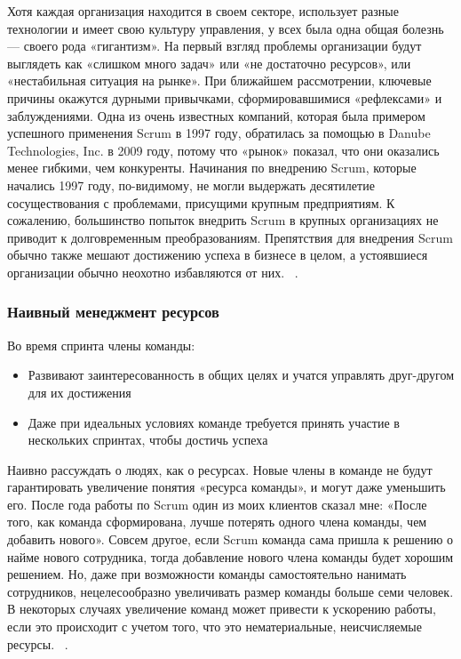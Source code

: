 \documentclass{../industrial-development}
\begin{document}
\lecturenotes
Хотя каждая организация находится в своем секторе, использует разные технологии и имеет свою культуру управления, у всех была одна общая болезнь — своего рода «гигантизм». На первый взгляд проблемы организации будут выглядеть как «слишком много задач» или «не достаточно ресурсов», или «нестабильная ситуация на рынке». При ближайшем рассмотрении, ключевые причины окажутся дурными привычками, сформировавшимися «рефлексами» и заблуждениями. Одна из очень известных компаний, которая была примером успешного применения Scrum в 1997 году, обратилась за помощью в Danube Technologies, Inc. в 2009 году, потому что «рынок» показал, что они оказались менее гибкими, чем конкуренты. Начинания по внедрению Scrum, которые начались 1997 году, по-видимому, не могли выдержать десятилетие сосуществования с проблемами, присущими крупным предприятиям. К сожалению, большинство попыток внедрить Scrum в крупных организациях не приводит к долговременным преобразованиям. Препятствия для внедрения Scrum обычно также мешают достижению успеха в бизнесе в целом, а устоявшиеся организации обычно неохотно избавляются от них. 
~\cite{Fowler}.


\begin{frame} \frametitle{Наивный менеджмент ресурсов }
	Во время спринта члены команды:
	\begin{itemize}
		\item Развивают заинтересованность в общих целях и учатся управлять друг-другом для их достижения
		\item Даже при идеальных условиях команде требуется принять участие в нескольких спринтах, чтобы достичь успеха
\end{itemize}
\end{frame}

\lecturenotes
Наивно рассуждать о людях, как о ресурсах. Новые члены в команде не будут гарантировать увеличение понятия «ресурса команды», и могут даже уменьшить его. После года работы по Scrum один из моих клиентов сказал мне: «После того, как команда сформирована, лучше потерять одного члена команды, чем добавить нового». Совсем другое, если Scrum команда сама пришла к решению о найме нового сотрудника, тогда добавление нового члена команды будет хорошим решением. Но, даже при возможности команды самостоятельно нанимать сотрудников, нецелесообразно увеличивать размер команды больше семи человек. В некоторых случаях увеличение команд может привести к ускорению работы, если это происходит с учетом того, что это нематериальные, неисчисляемые ресурсы. 
~\cite{Fowler}.
\end{document}
